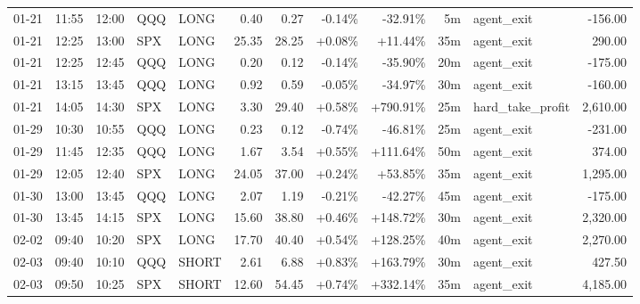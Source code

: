 \documentclass[11pt,a4paper,twoside]{article}
\begin{document}
\begin{center}
\begin{longtable}{>{\color{txtmain}}l l l l l r r r r r >{\color{txtmain}}l r}
01-21 & 11:55 & 12:00 & QQQ & LONG & 0.40 & 0.27 & \textcolor{lossred}{-0.14\%} & \textcolor{lossred}{-32.91\%} & 5m & agent\_exit & \textcolor{lossred}{-156.00} \\
01-21 & 12:25 & 13:00 & SPX & LONG & 25.35 & 28.25 & \textcolor{wingreen}{+0.08\%} & \textcolor{wingreen}{+11.44\%} & 35m & agent\_exit & \textcolor{wingreen}{290.00} \\
01-21 & 12:25 & 12:45 & QQQ & LONG & 0.20 & 0.12 & \textcolor{lossred}{-0.14\%} & \textcolor{lossred}{-35.90\%} & 20m & agent\_exit & \textcolor{lossred}{-175.00} \\
01-21 & 13:15 & 13:45 & QQQ & LONG & 0.92 & 0.59 & \textcolor{lossred}{-0.05\%} & \textcolor{lossred}{-34.97\%} & 30m & agent\_exit & \textcolor{lossred}{-160.00} \\
01-21 & 14:05 & 14:30 & SPX & LONG & 3.30 & 29.40 & \textcolor{wingreen}{+0.58\%} & \textcolor{wingreen}{+790.91\%} & 25m & hard\_take\_profit & \textcolor{wingreen}{2,610.00} \\
01-29 & 10:30 & 10:55 & QQQ & LONG & 0.23 & 0.12 & \textcolor{lossred}{-0.74\%} & \textcolor{lossred}{-46.81\%} & 25m & agent\_exit & \textcolor{lossred}{-231.00} \\
01-29 & 11:45 & 12:35 & QQQ & LONG & 1.67 & 3.54 & \textcolor{wingreen}{+0.55\%} & \textcolor{wingreen}{+111.64\%} & 50m & agent\_exit & \textcolor{wingreen}{374.00} \\
01-29 & 12:05 & 12:40 & SPX & LONG & 24.05 & 37.00 & \textcolor{wingreen}{+0.24\%} & \textcolor{wingreen}{+53.85\%} & 35m & agent\_exit & \textcolor{wingreen}{1,295.00} \\
01-30 & 13:00 & 13:45 & QQQ & LONG & 2.07 & 1.19 & \textcolor{lossred}{-0.21\%} & \textcolor{lossred}{-42.27\%} & 45m & agent\_exit & \textcolor{lossred}{-175.00} \\
01-30 & 13:45 & 14:15 & SPX & LONG & 15.60 & 38.80 & \textcolor{wingreen}{+0.46\%} & \textcolor{wingreen}{+148.72\%} & 30m & agent\_exit & \textcolor{wingreen}{2,320.00} \\
02-02 & 09:40 & 10:20 & SPX & LONG & 17.70 & 40.40 & \textcolor{wingreen}{+0.54\%} & \textcolor{wingreen}{+128.25\%} & 40m & agent\_exit & \textcolor{wingreen}{2,270.00} \\
02-03 & 09:40 & 10:10 & QQQ & SHORT & 2.61 & 6.88 & \textcolor{wingreen}{+0.83\%} & \textcolor{wingreen}{+163.79\%} & 30m & agent\_exit & \textcolor{wingreen}{427.50} \\
02-03 & 09:50 & 10:25 & SPX & SHORT & 12.60 & 54.45 & \textcolor{wingreen}{+0.74\%} & \textcolor{wingreen}{+332.14\%} & 35m & agent\_exit & \textcolor{wingreen}{4,185.00} \\

\end{longtable}
\end{center}
\end{document}
